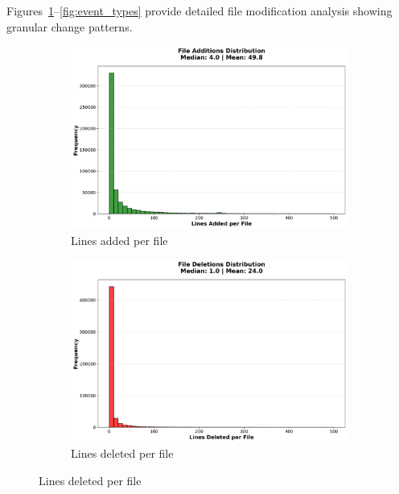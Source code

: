 \documentclass[11pt]{article}
\begin{document}
Figures~\ref{fig:file_adds}--\ref{fig:event_types} provide detailed file modification analysis showing granular change patterns.

\begin{figure}[H]
\centering
\begin{subfigure}[b]{0.48\textwidth}
\centering
\includegraphics[width=\textwidth]{figures_individual/25_file_additions_histogram.png}
\caption{Lines added per file}
\label{fig:file_adds}
\end{subfigure}
\hfill
\begin{subfigure}[b]{0.48\textwidth}
\centering
\includegraphics[width=\textwidth]{figures_individual/26_file_deletions_histogram.png}
\caption{Lines deleted per file}
\label{fig:file_dels}
\end{subfigure}

\vspace{0.3cm}


\end{figure}
\end{document}
